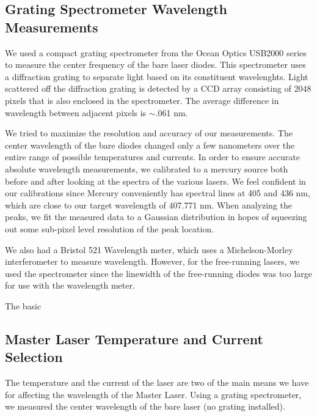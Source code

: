 \subsection{Grating Spectrometer Wavelength Measurements}

We used a compact grating spectrometer from the Ocean Optics USB2000 series to measure the center frequency of the bare laser diodes. This spectrometer uses a diffraction grating to separate light based on its constituent wavelenghts. Light scattered off the diffraction grating is detected by a CCD array consisting of 2048 pixels that is also enclosed in the spectrometer. The average difference in wavelength between adjacent pixels is $\sim$.061 nm. %

We tried to maximize the resolution and accuracy of our measurements. The center wavelength of the bare diodes changed only a few nanometers over the entire range of possible temperatures and currents. In order to ensure accurate absolute wavelength measurements, we calibrated to a mercury source both before and after looking at the spectra of the various lasers. We feel confident in our calibrations since Mercury conveniently has spectral lines at 405 and 436 nm, which are close to our target wavelength of 407.771 nm. When analyzing the peaks, we fit the measured data to a Gaussian distribution in hopes of squeezing out some sub-pixel level resolution of the peak location. 



We also had a Bristol 521 Wavelength meter, which uses a Michelson-Morley interferometer to measure wavelength. However, for the free-running lasers, we used the spectrometer since the linewidth of the free-running diodes was too large for use with the wavelength meter. 

The basic 


\subsection{Master Laser Temperature and Current Selection}

The temperature and the current of the laser are two of the main means we have for affecting the wavelength of the Master Laser. Using a grating spectrometer, we measured the center wavelength of the bare laser (no grating installed). 



